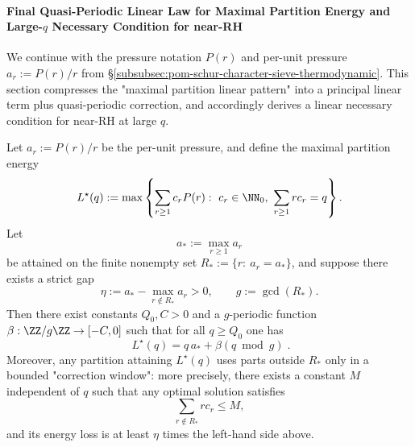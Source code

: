 
\paragraph{Final Quasi-Periodic Linear Law for Maximal Partition Energy and Large-\texorpdfstring{$q$}{q} Necessary Condition for near-RH}
We continue with the pressure notation \(P(r)\) and per-unit pressure \(a_r:=P(r)/r\) from \S\ref{subsubsec:pom-schur-character-sieve-thermodynamic}.
This section compresses the "maximal partition linear pattern" into a principal linear term plus quasi-periodic correction, and accordingly derives a linear necessary condition for near-RH at large \(q\).

\begin{proposition}\label{prop:pom-schur-partition-energy-eventual-quasiperiodic-linear-law}
Let \(a_r:=P(r)/r\) be the per-unit pressure, and define the maximal partition energy
\[
L^\star(q):=\max\left\{\sum_{r\ge 1}c_r P(r):\ c_r\in\NN_0,\ \sum_{r\ge 1}r c_r=q\right\}.
\]
Let
\[
a_*:=\max_{r\ge 1}a_r
\]
be attained on the finite nonempty set
\(
R_*:=\{r:\ a_r=a_*\}
\),
and suppose there exists a strict gap
\[
\eta:=a_*-\max_{r\notin R_*}a_r>0,
\qquad
g:=\gcd(R_*).
\]
Then there exist constants \(Q_0,C>0\) and a \(g\)-periodic function \(\beta:\ZZ/g\ZZ\to[-C,0]\) such that for all \(q\ge Q_0\) one has
\[
\boxed{\;
L^\star(q)=q\,a_*+\beta(q\bmod g)\; }.
\]
Moreover, any partition attaining \(L^\star(q)\) uses parts outside \(R_*\) only in a bounded "correction window":
more precisely, there exists a constant \(M\) independent of \(q\) such that any optimal solution satisfies
\[
\sum_{r\notin R_*} r c_r\le M,
\]
and its energy loss is at least \(\eta\) times the left-hand side above.
\end{proposition}
